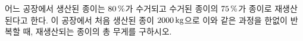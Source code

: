 어느 공장에서 생산된 종이는 $80\mkern3mu \%$가 수거되고 수거된 종이의 $75\mkern3mu \%$가 종이로 재생산된다고 한다. 이 공장에서 처음 생산된 종이 $2000\mkern3mu \mathrm{kg}$으로 이와 같은 과정을 한없이 반복할 때, 재생산되는 종이의 총 무게를 구하시오.
